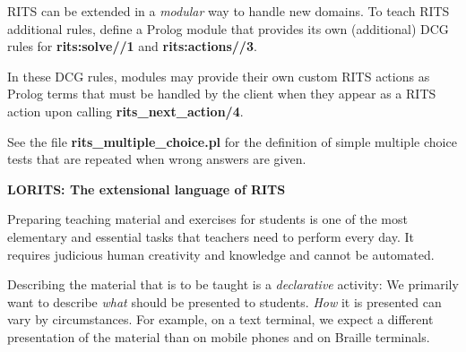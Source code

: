 \documentclass[a4paper,11pt]{article}
\begin{document}
RITS can be extended in a \textit{modular} way to handle new domains.
To teach RITS additional rules, define a Prolog module that provides
its own (additional) DCG rules for \textbf{rits:solve//1} and
\textbf{rits:actions//3}. 

In these DCG rules, modules may provide their own custom RITS actions
as Prolog terms that must be handled by the client when they appear as
a RITS action upon calling \textbf{rits\_next\_action/4}.

See the file \textbf{rits\_multiple\_choice.pl} for the definition of
simple multiple choice tests that are repeated when wrong answers are
given.

\bigskip
\begin{center}
  \large\textbf{LORITS: The extensional language of RITS}
\end{center}

\medskip

Preparing teaching material and exercises for students is one of the
most elementary and essential tasks that teachers need to perform
every day. It requires judicious human creativity and knowledge and
cannot be automated.

Describing the material that is to be taught is a \textit{declarative}
activity: We primarily want to describe \textit{what} should be
presented to students. \textit{How} it is presented can vary by
circumstances. For example, on a text terminal, we expect a different
presentation of the material than on mobile phones and on Braille
terminals.


\vfil
\end{document}
